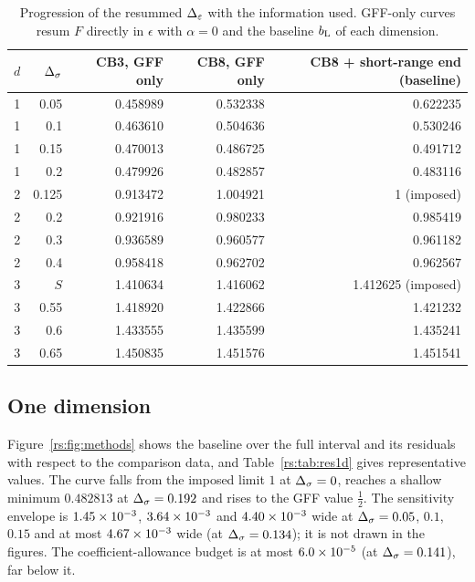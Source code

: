\begin{table}[htbp]\centering\small
\begin{tabular}{@{}c r r r r@{}}
\toprule
$d$ & $\Delta_\sigma$ & CB3, GFF only & CB8, GFF only & CB8 + short-range end (baseline)\\ \midrule
1 & 0.05 & 0.458989 & 0.532338 & 0.622235\\
1 & 0.1 & 0.463610 & 0.504636 & 0.530246\\
1 & 0.15 & 0.470013 & 0.486725 & 0.491712\\
1 & 0.2 & 0.479926 & 0.482857 & 0.483116\\ \midrule
2 & 0.125 & 0.913472 & 1.004921 & 1 (imposed)\\
2 & 0.2 & 0.921916 & 0.980233 & 0.985419\\
2 & 0.3 & 0.936589 & 0.960577 & 0.961182\\
2 & 0.4 & 0.958418 & 0.962702 & 0.962567\\ \midrule
3 & $S$ & 1.410634 & 1.416062 & 1.412625 (imposed)\\
3 & 0.55 & 1.418920 & 1.422866 & 1.421232\\
3 & 0.6 & 1.433555 & 1.435599 & 1.435241\\
3 & 0.65 & 1.450835 & 1.451576 & 1.451541\\
\bottomrule
\end{tabular}
\caption{Progression of the resummed $\Delta_\varepsilon$ with the information used. GFF-only curves
resum $F$ directly in $\epsilon$ with $\alpha=0$ and the baseline $b_{\mathrm L}$ of each dimension.}
\label{rs:tab:progression}
\end{table}

\subsection{One dimension}\label{rs:sec:res1d}
Figure~\ref{rs:fig:methods} shows the baseline over the full interval and its residuals
with respect to the comparison data, and Table~\ref{rs:tab:res1d} gives representative values.
The curve falls from the imposed limit $1$ at $\Delta_\sigma=0$, reaches a shallow minimum
$0.482813$ at $\Delta_\sigma=0.192$ and rises to the GFF value $\frac12$. The sensitivity envelope is
$1.45\times10^{-3}$, $3.64\times10^{-3}$ and $4.40\times10^{-3}$ wide at $\Delta_\sigma=0.05$, $0.1$, $0.15$ and
at most $4.67\times10^{-3}$ wide (at $\Delta_\sigma=0.134$); it is not drawn in the figures. The
coefficient-allowance budget is at most $6.0\times10^{-5}$ (at $\Delta_\sigma=0.141$), far below it.

